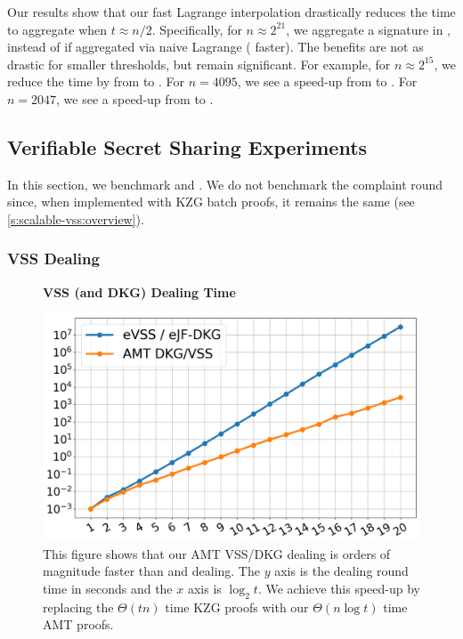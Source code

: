 Our results show that our fast Lagrange interpolation drastically reduces the time to aggregate when $t\approx n/2$.
Specifically, for $n\approx 2^{21}$, we aggregate a signature in , instead of  if aggregated via naive Lagrange ( faster).
The benefits are not as drastic for smaller thresholds, but remain significant.
For example, for $n\approx 2^{15}$, we reduce the time by  from  to .
For $n=4095$, we see a  speed-up from  to .
For $n=2047$, we see a  speed-up from  to .


\subsection{Verifiable Secret Sharing Experiments}
\label{s:eval:vss}
In this section, we benchmark \evss and \ourvss.
We do not benchmark the complaint round since, when implemented with KZG batch proofs, it remains the same (see \cref{s:scalable-vss:overview}).

\subsubsection{VSS Dealing}
\label{s:eval:vss:deal}

\begin{figure}[t]
    \centering
    \textbf{VSS (and DKG) Dealing Time}\par\medskip
    \includegraphics[width=0.70\columnwidth]{figures-thresh/all-deal-times.png}
    \caption{
        This figure shows that our AMT VSS/DKG dealing is orders of magnitude faster than \evss and \ejfdkg dealing. 
        The $y$ axis is the dealing round time in seconds and the $x$ axis is $\log_2{t}$.
        We achieve this speed-up by replacing the $\Theta(tn)$ time KZG proofs with our  $\Theta(n\log{t})$ time AMT proofs.
    }
    \label{f:all-deal-times}
\end{figure}

